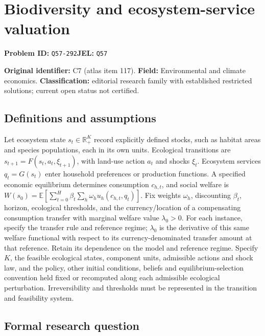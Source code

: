 \documentclass[11pt,a4paper]{article}
\begin{document}
\section*{Biodiversity and ecosystem-service valuation}
\textbf{Problem ID:} \texttt{Q57-292}\quad \textbf{JEL:} \texttt{Q57}\par
\label{problem:OP-0117}
\label{audited:ECON-058}


\label{atlas:prob:C7}

\noindent\textbf{Original identifier:} C7 (atlas item 117). \textbf{Field:} Environmental and climate economics. \textbf{Classification:} editorial research family with established restricted solutions; current open status not certified.

\subsection*{Definitions and assumptions}

Let ecosystem state $s_t\in\mathbb R_+^K$ record explicitly defined stocks, such as habitat areas and species populations, each in its own units. Ecological transitions are $s_{t+1}=F(s_t,a_t,\xi_{t+1})$, with land-use action $a_t$ and shocks $\xi_t$. Ecosystem services $q_t=G(s_t)$ enter household preferences or production functions. A specified economic equilibrium determines consumption $c_{h,t}$, and social welfare is $W(s_0)=\mathbb E[\sum_{t=0}^H\beta_t\sum_h\omega_hu_h(c_{h,t},q_t)]$. Fix weights $\omega_h$, discounting $\beta_t$, horizon, ecological thresholds, and the currency/location of a compensating consumption transfer with marginal welfare value $\lambda_0>0$. For each instance, specify the transfer rule and reference regime; $\lambda_0$ is the derivative of this same welfare functional with respect to its currency-denominated transfer amount at that reference. Retain its dependence on the model and reference regime. Specify $K$, the feasible ecological states, component units, admissible actions and shock law, and the policy, other initial conditions, beliefs and equilibrium-selection convention held fixed or recomputed along each admissible ecological perturbation. Irreversibility and thresholds must be represented in the transition and feasibility system.

\subsection*{Formal research question}
\end{document}
